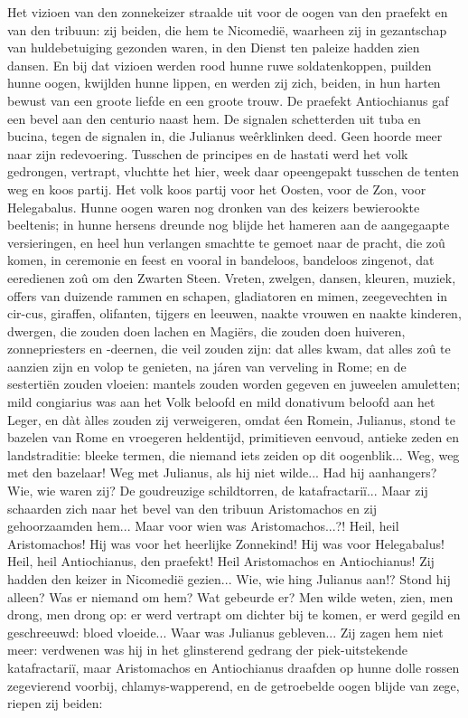 \documentclass[a4paper, 12pt, oneside, dutch]{article}
\begin{document}
Het vizioen van den zonnekeizer straalde uit voor de oogen van den praefekt en van den tribuun: zij beiden, die hem te Nicomedië, waarheen zij in gezantschap van huldebetuiging gezonden waren, in den Dienst ten paleize hadden zien dansen. En bij dat vizioen werden rood hunne ruwe soldatenkoppen, puilden hunne oogen, kwijlden hunne lippen, en werden zij zich, beiden, in hun harten bewust van een groote liefde en een groote trouw. De praefekt Antiochianus gaf een bevel aan den centurio naast hem. De signalen schetterden uit tuba en bucina, tegen de signalen in, die Julianus weêrklinken deed. Geen hoorde meer naar zijn redevoering. Tusschen de principes en de hastati werd het volk gedrongen, vertrapt, vluchtte het hier, week daar opeengepakt tusschen de tenten weg en koos partij. Het volk koos partij voor het Oosten, voor de Zon, voor Helegabalus. Hunne oogen waren nog dronken van des keizers bewierookte beeltenis; in hunne hersens dreunde nog blijde het hameren aan de aangegaapte versieringen, en heel hun verlangen smachtte te gemoet naar de pracht, die zoû komen, in ceremonie en feest en vooral in bandeloos, bandeloos zingenot, dat eeredienen zoû om den Zwarten Steen. Vreten, zwelgen, dansen, kleuren, muziek, offers van duizende rammen en schapen, gladiatoren en mimen, zeegevechten in cir-cus, giraffen, olifanten, tijgers en leeuwen, naakte vrouwen en naakte kinderen, dwergen, die zouden doen lachen en Magiërs, die zouden doen huiveren, zonnepriesters en -deernen, die veil zouden zijn: dat alles kwam, dat alles zoû te aanzien zijn en volop te genieten, na járen van verveling in Rome; en de sestertiën zouden vloeien: mantels zouden worden gegeven en juweelen amuletten; mild congiarius was aan het Volk beloofd en mild donativum beloofd aan het Leger, en dàt àlles zouden zij verweigeren, omdat éen Romein, Julianus, stond te bazelen van Rome en vroegeren heldentijd, primitieven eenvoud, antieke zeden en landstraditie: bleeke termen, die niemand iets zeiden op dit oogenblik... Weg, weg met den bazelaar! Weg met Julianus, als hij niet wilde... Had hij aanhangers? Wie, wie waren zij? De goudreuzige schildtorren, de katafractariï... Maar zij schaarden zich naar het bevel van den tribuun Aristomachos en zij gehoorzaamden hem... Maar voor wien was Aristomachos...?! Heil, heil Aristomachos! Hij was voor het heerlijke Zonnekind! Hij was voor Helegabalus! Heil, heil Antiochianus, den praefekt! Heil Aristomachos en Antiochianus! Zij hadden den keizer in Nicomedië gezien... Wie, wie hing Julianus aan!? Stond hij alleen? Was er niemand om hem? Wat gebeurde er? Men wilde weten, zien, men drong, men drong op: er werd vertrapt om dichter bij te komen, er werd gegild en geschreeuwd: bloed vloeide... Waar was Julianus gebleven... Zij zagen hem niet meer: verdwenen was hij in het glinsterend gedrang der piek-uitstekende katafractariï, maar Aristomachos en Antiochianus draafden op hunne dolle rossen zegevierend voorbij, chlamys-wapperend, en de getroebelde oogen blijde van zege, riepen zij beiden:
\end{document}
